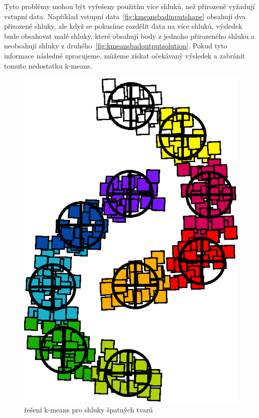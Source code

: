 Tyto problémy mohou být vyřešeny použitím více shluků, než přirozeně vyžadují vstupní data. Například vstupní data~\autoref{fig:kmeansbadinputshape} obsahují dva přirozené shluky, ale když se pokusíme rozdělit data na více shluků, výsledek bude obsahovat malé shluky, které obsahují body z jednoho přirozeného shluku a neobsahují shluky z druhého~\autoref{fig:kmeansbadoutputsolution}. Pokud tyto informace následně zpracujeme, můžeme získat očekávaný výsledek a zabránit tomuto nedostatku k-means.
\begin{figure}[h]
  \centering
  \includegraphics[width=.3\textwidth]{img/kmeans_badOutputSampleShapeSolution.eps}
  \caption{řešení k-means pro shluky špatných tvarů}
  \label{fig:kmeansbadoutputsolution}
\end{figure}


